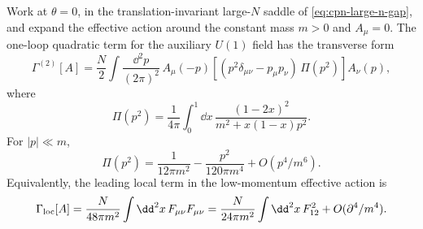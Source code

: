 \begin{proposition}
\label{prop:cpn-large-n-induced-gauge-kernel}
Work at \(\theta=0\), in the translation-invariant large-\(N\) saddle of
\eqref{eq:cpn-large-n-gap}, and expand the effective action around the
constant mass \(m>0\) and \(A_\mu=0\).  The one-loop quadratic term for the
auxiliary \(U(1)\) field has the transverse form
\begin{equation}
  \Gamma^{(2)}[A]
  =
  \frac{N}{2}\int\frac{\dd^2p}{(2\pi)^2}\,
  A_\mu(-p)
  \left[
    (p^2\delta_{\mu\nu}-p_\mu p_\nu)\,
    \Pi(p^2)
  \right]
  A_\nu(p),
  \label{eq:cpn-large-n-gauge-kernel}
\end{equation}
where
\begin{equation}
  \Pi(p^2)
  =
  \frac1{4\pi}\int_0^1\dd x\,
  \frac{(1-2x)^2}{m^2+x(1-x)p^2}.
  \label{eq:cpn-large-n-polarization-scalar}
\end{equation}
For \(|p|\ll m\),
\begin{equation}
  \Pi(p^2)
  =
  \frac1{12\pi m^2}
  -\frac{p^2}{120\pi m^4}
  +O(p^4/m^6).
  \label{eq:cpn-large-n-polarization-expansion}
\end{equation}
Equivalently, the leading local term in the low-momentum effective action is
\begin{equation}
  \Gamma_{\rm loc}[A]
  =
  \frac{N}{48\pi m^2}\int\dd^2x\,F_{\mu\nu}F_{\mu\nu}
  =
  \frac{N}{24\pi m^2}\int\dd^2x\,F_{12}^2
  +O(\partial^4/m^4).
  \label{eq:cpn-large-n-induced-maxwell}
\end{equation}
\end{proposition}

